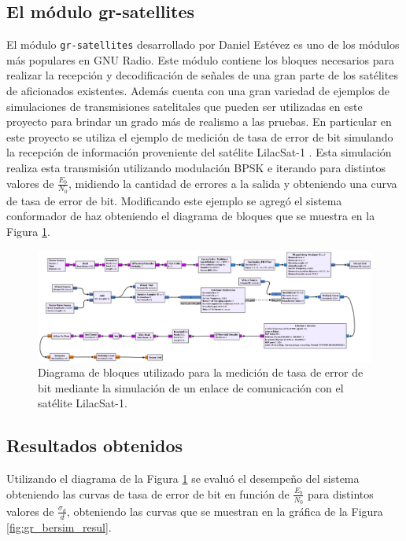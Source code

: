 \subsection{El módulo gr-satellites}
El módulo \texttt{gr-satellites} desarrollado por Daniel Estévez \cite{bib:gr-satellites} es uno de los módulos más populares en GNU Radio. Este módulo contiene los bloques necesarios para realizar la recepción y decodificación de señales de una gran parte de los satélites de aficionados existentes. Además cuenta con una gran variedad de ejemplos de simulaciones de transmisiones satelitales que pueden ser utilizadas en este proyecto para brindar un grado más de realismo a las pruebas. En particular en este proyecto se utiliza el ejemplo de medición de tasa de error de bit simulando la recepción de información proveniente del satélite LilacSat-1 \cite{bib:ber-simulation}. Esta simulación realiza esta transmisión utilizando modulación BPSK e iterando para distintos valores de $\frac{E_b}{N_0}$, midiendo la cantidad de errores a la salida y obteniendo una curva de tasa de error de bit. Modificando este ejemplo se agregó el sistema conformador de haz obteniendo el diagrama de bloques que se muestra en la Figura \ref{fig:gr_bersim}.

\begin{figure}
    \centering
    \includegraphics[width=0.9\linewidth]{images/07-GNURadio/gr_bersim.png}
    \caption{Diagrama de bloques utilizado para la medición de tasa de error de bit mediante la simulación de un enlace de comunicación con el satélite LilacSat-1.}
    \label{fig:gr_bersim}
\end{figure}

\subsection{Resultados obtenidos}\label{subc:gr_bertest}

Utilizando el diagrama de la Figura \ref{fig:gr_bersim} se evaluó el desempeño del sistema obteniendo las curvas de tasa de error de bit en función de $\frac{E_b}{N_0}$ para distintos valores de $\frac{\sigma_d}{d}$, obteniendo las curvas que se muestran en la gráfica de la Figura \ref{fig:gr_bersim_resul}.


